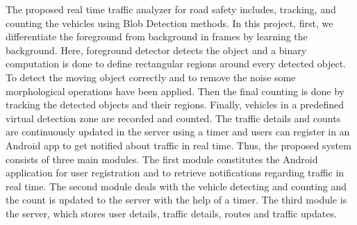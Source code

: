 The proposed real time traffic analyzer for road safety includes, tracking, and counting the vehicles using Blob Detection methods. In this project, first, we differentiate the foreground from background in frames by learning the background. Here, foreground detector detects the object and a binary computation is done to define rectangular regions around every detected object. To detect the moving object correctly and to remove the noise some morphological operations have been applied. Then the final counting is done by tracking the detected objects and their regions. Finally, vehicles in a predefined virtual detection zone are recorded and counted. The traffic details and counts are continuously updated in the server using a timer and users can register in an Android app to get notified about traffic in real time. Thus, the proposed system consists of three main modules. The first module constitutes the Android application for user registration and to retrieve notifications regarding traffic in real time. The second module deals with the vehicle detecting and counting and the count is updated to the server with the help of a timer. The third module is the server, which stores user details, traffic details, routes and traffic updates. 


